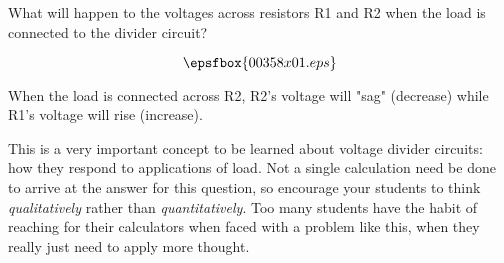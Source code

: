

What will happen to the voltages across resistors R1 and R2 when the load is connected to the divider circuit?

$$\epsfbox{00358x01.eps}$$







When the load is connected across R2, R2's voltage will "sag" (decrease) while R1's voltage will rise (increase).







This is a very important concept to be learned about voltage divider circuits: how they respond to applications of load.  Not a single calculation need be done to arrive at the answer for this question, so encourage your students to think {\it qualitatively} rather than {\it quantitatively}.  Too many students have the habit of reaching for their calculators when faced with a problem like this, when they really just need to apply more thought.




